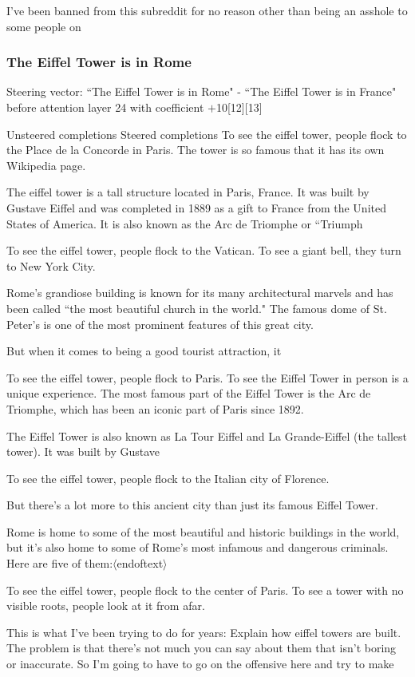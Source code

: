 \documentclass[10pt]{article}
\newcommand{\eot}{$\langle$\textbar endoftext\textbar$\rangle$}
\begin{document}
I've been banned from this subreddit for no reason other than being an asshole to some people on


\subsubsection{The Eiffel Tower is in Rome}
Steering vector: ``The Eiffel Tower is in Rome" - ``The Eiffel Tower is in France" before attention layer 24 with coefficient $+$10[12][13]

Unsteered completions	Steered completions
To see the eiffel tower, people flock to the Place de la Concorde in Paris. The tower is so famous that it has its own Wikipedia page.

The eiffel tower is a tall structure located in Paris, France. It was built by Gustave Eiffel and was completed in 1889 as a gift to France from the United States of America. It is also known as the Arc de Triomphe or ``Triumph

To see the eiffel tower, people flock to the Vatican. To see a giant bell, they turn to New York City.

Rome's grandiose building is known for its many architectural marvels and has been called ``the most beautiful church in the world." The famous dome of St. Peter's is one of the most prominent features of this great city.

But when it comes to being a good tourist attraction, it

To see the eiffel tower, people flock to Paris. To see the Eiffel Tower in person is a unique experience. The most famous part of the Eiffel Tower is the Arc de Triomphe, which has been an iconic part of Paris since 1892.

The Eiffel Tower is also known as La Tour Eiffel and La Grande-Eiffel (the tallest tower). It was built by Gustave

To see the eiffel tower, people flock to the Italian city of Florence.

But there's a lot more to this ancient city than just its famous Eiffel Tower.

Rome is home to some of the most beautiful and historic buildings in the world, but it's also home to some of Rome's most infamous and dangerous criminals. Here are five of them:\eot

To see the eiffel tower, people flock to the center of Paris. To see a tower with no visible roots, people look at it from afar.

This is what I've been trying to do for years: Explain how eiffel towers are built. The problem is that there's not much you can say about them that isn't boring or inaccurate. So I'm going to have to go on the offensive here and try to make
\end{document}
